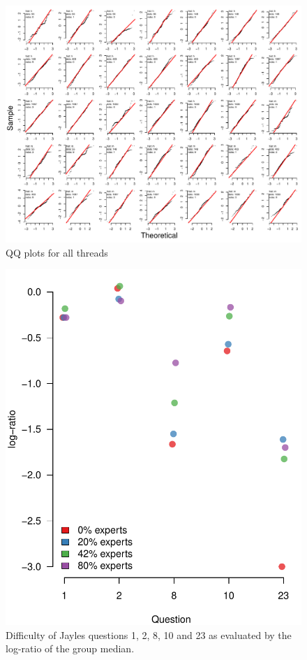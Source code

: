 \documentclass[9pt,twoside,lineno]{pnas-new}
\begin{document}
\begin{figure}
	\centering
	\hfill
	\includegraphics[width=1\linewidth]{../plots/qqplots_AMT.pdf}			
	\caption{QQ plots for all threads}
	\label{fig: qq plots Mturk data}
	\hfill
\end{figure}


\begin{figure}
	\centering\includegraphics[width=.7\textwidth]{../plots/jayles_difficulty.pdf}
	\caption{Difficulty of Jayles questions 1, 2, 8, 10 and 23 as evaluated by the log-ratio of the group median.}
	\label{fig: Jayles question difficulty}
\end{figure}
\end{document}
